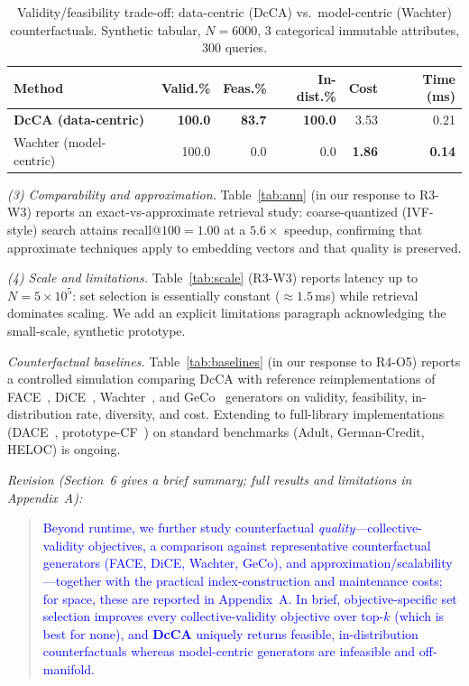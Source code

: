 \begin{table}[h]
\centering\small
\caption{Validity/feasibility trade-off: data-centric (DcCA) vs.\ model-centric (Wachter) counterfactuals. Synthetic tabular, $N{=}6000$, $3$ categorical immutable attributes, $300$ queries.}
\label{tab:validity}
\begin{tabular}{lrrrrr}
\toprule
Method & Valid.\% & Feas.\% & In-dist.\% & Cost & Time (ms) \\
\midrule
\textbf{DcCA (data-centric)}    & \textbf{100.0} & \textbf{83.7} & \textbf{100.0} & 3.53 & 0.21 \\
Wachter (model-centric)~\cite{wachter2017counterfactual} & 100.0 & 0.0 & 0.0 & \textbf{1.86} & \textbf{0.14} \\
\bottomrule
\end{tabular}
\end{table}

\emph{(3) Comparability and approximation.} Table~\ref{tab:ann} (in our response to R3-W3) reports an exact-vs-approximate retrieval study: coarse-quantized (IVF-style) search attains recall@$100=1.00$ at a $5.6\times$ speedup, confirming that approximate techniques apply to embedding vectors and that quality is preserved.

\emph{(4) Scale and limitations.} Table~\ref{tab:scale} (R3-W3) reports latency up to $N=5\times10^{5}$: set selection is essentially constant ($\approx1.5$\,ms) while retrieval dominates scaling. We add an explicit limitations paragraph acknowledging the small-scale, synthetic prototype.

\emph{Counterfactual baselines.} Table~\ref{tab:baselines} (in our response to R4-O5) reports a controlled simulation comparing DcCA with reference reimplementations of FACE~\cite{poyiadzi2020face}, DiCE~\cite{mothilal2020explaining}, Wachter~\cite{wachter2017counterfactual}, and GeCo~\cite{schleich2021geco} generators on validity, feasibility, in-distribution rate, diversity, and cost. Extending to full-library implementations (DACE~\cite{kanamori2020dace}, prototype-CF~\cite{vanlooveren2020interpretable}) on standard benchmarks (Adult, German-Credit, HELOC) is ongoing.

\noindent\emph{Revision (Section~6 gives a brief summary; full results and limitations in Appendix~A):}
\begin{quote}
\textcolor{blue}{Beyond runtime, we further study counterfactual \emph{quality}---collective-validity objectives, a comparison against representative counterfactual generators (FACE, DiCE, Wachter, GeCo), and approximation/scalability---together with the practical index-construction and maintenance costs; for space, these are reported in Appendix~A. In brief, objective-specific set selection improves every collective-validity objective over top-$k$ (which is best for none), and \textbf{DcCA} uniquely returns feasible, in-distribution counterfactuals whereas model-centric generators are infeasible and off-manifold.}
\end{quote}
